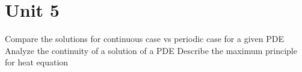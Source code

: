 \documentclass[12pt, a4paper]{article}
\begin{document}
\section*{Unit 5}
\vspace{1em}

Compare the solutions for continuous case vs periodic case for a given PDE
Analyze the continuity of a solution of a PDE
Describe the maximum principle for heat equation
\end{document}

